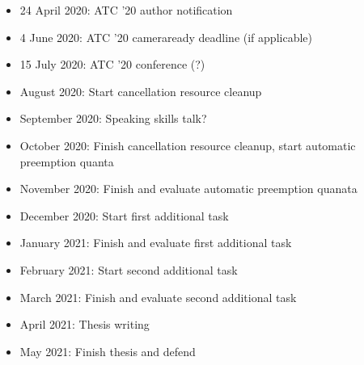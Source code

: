 \documentclass[12pt,letterpaper,openright]{report}
\begin{document}
\begin{itemize}
\item 24 April 2020: ATC '20 author notification
\item 4 June 2020: ATC '20 cameraready deadline (if applicable)
\item 15 July 2020: ATC '20 conference (?)
\item August 2020: Start cancellation resource cleanup
\item September 2020: Speaking skills talk?
\item October 2020: Finish cancellation resource cleanup, start automatic preemption quanta
\item November 2020: Finish and evaluate automatic preemption quanata
\item December 2020: Start first additional task
\item January 2021: Finish and evaluate first additional task
\item February 2021: Start second additional task
\item March 2021: Finish and evaluate second additional task
\item April 2021: Thesis writing
\item May 2021: Finish thesis and defend
\end{itemize}
\end{document}
